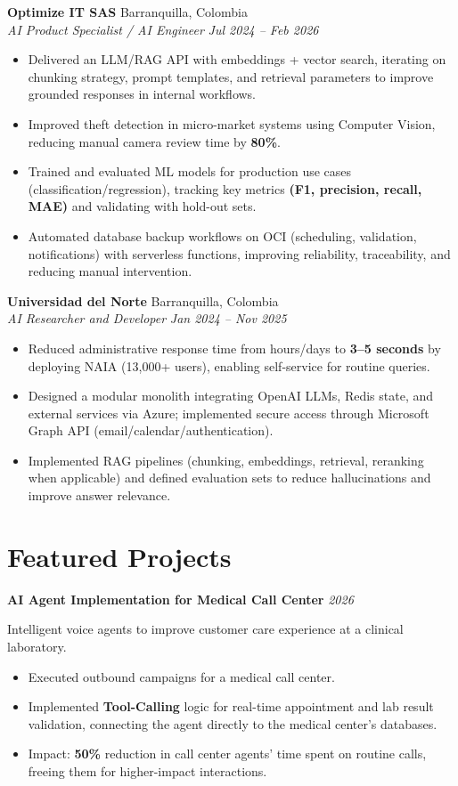 \documentclass[letterpaper,10pt]{article}
\newcommand{\resumeItem}[1]{\item \small{#1}}
\newcommand{\resumeSubheading}[4]{%
  \textbf{#1} \hfill #2 \\
  \textit{\small #3} \hfill \textit{\small #4} \\
  \vspace{-2pt}
}
\newcommand{\resumeProject}[3]{%
  \par\noindent\textbf{#1} \hfill \textit{\small #2} \par
  \noindent\small #3 \par
}
\newcommand{\betweenRoles}{\vspace{4pt}}
\newcommand{\projectGap}{\vspace{6pt}}
\begin{document}
\resumeSubheading
{Optimize IT SAS}{Barranquilla, Colombia}
{AI Product Specialist / AI Engineer}{Jul 2024 -- Feb 2026}
\begin{itemize}
  \resumeItem{Delivered an LLM/RAG API with embeddings + vector search, iterating on chunking strategy, prompt templates, and retrieval parameters to improve grounded responses in internal workflows.}
  \resumeItem{Improved theft detection in micro-market systems using Computer Vision, reducing manual camera review time by \textbf{80\%}.}
  \resumeItem{Trained and evaluated ML models for production use cases (classification/regression), tracking key metrics \textbf{(F1, precision, recall, MAE)} and validating with hold-out sets.}
  \resumeItem{Automated database backup workflows on OCI (scheduling, validation, notifications) with serverless functions, improving reliability, traceability, and reducing manual intervention.}
\end{itemize}
\betweenRoles

\resumeSubheading
{Universidad del Norte}{Barranquilla, Colombia}
{AI Researcher and Developer}{Jan 2024 -- Nov 2025}
\begin{itemize}
  \resumeItem{Reduced administrative response time from hours/days to \textbf{3--5 seconds} by deploying NAIA (13{,}000+ users), enabling self-service for routine queries.}
  \resumeItem{Designed a modular monolith integrating OpenAI LLMs, Redis state, and external services via Azure; implemented secure access through Microsoft Graph API (email/calendar/authentication).}
  \resumeItem{Implemented RAG pipelines (chunking, embeddings, retrieval, reranking when applicable) and defined evaluation sets to reduce hallucinations and improve answer relevance.}
\end{itemize}

\section{Featured Projects}

\resumeProject
{AI Agent Implementation for Medical Call Center}{2026}
{Intelligent voice agents to improve customer care experience at a clinical laboratory.}
\begin{itemize}
  \resumeItem{Executed outbound campaigns for a medical call center.}
  \resumeItem{Implemented \textbf{Tool-Calling} logic for real-time appointment and lab result validation, connecting the agent directly to the medical center's databases.}
  \resumeItem{Impact: \textbf{50\%} reduction in call center agents' time spent on routine calls, freeing them for higher-impact interactions.}
\end{itemize}
\projectGap
\end{document}
